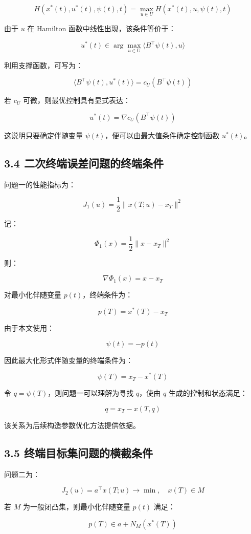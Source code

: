 \documentclass[UTF8,a4paper,zihao=-4]{ctexart}
\begin{document}
\[
H(x^*(t),u^*(t),\psi(t),t)
=
\max_{u\in U}H(x^*(t),u,\psi(t),t)
\]

由于 $u$ 在 Hamilton 函数中线性出现，该条件等价于：

\[
u^*(t)\in\arg\max_{u\in U}
\langle B^\top\psi(t),u\rangle
\]

利用支撑函数，可写为：

\[
\langle B^\top\psi(t),u^*(t)\rangle
=
c_U(B^\top\psi(t))
\]

若 $c_U$ 可微，则最优控制具有显式表达：

\[
u^*(t)=\nabla c_U(B^\top\psi(t))
\]

这说明只要确定伴随变量 $\psi(t)$，便可以由最大值条件确定控制函数 $u^*(t)$。

\subsection{3.4 二次终端误差问题的终端条件}

问题一的性能指标为：

\[
J_1(u)=\frac{1}{2}\|x(T;u)-x_T\|^2
\]

记：

\[
\Phi_1(x)=\frac{1}{2}\|x-x_T\|^2
\]

则：

\[
\nabla\Phi_1(x)=x-x_T
\]

对最小化伴随变量 $p(t)$，终端条件为：

\[
p(T)=x^*(T)-x_T
\]

由于本文使用：

\[
\psi(t)=-p(t)
\]

因此最大化形式伴随变量的终端条件为：

\[
\psi(T)=x_T-x^*(T)
\]

令 $q=\psi(T)$，则问题一可以理解为寻找 $q$，使由 $q$ 生成的控制和状态满足：

\[
q=x_T-x(T,q)
\]

该关系为后续构造参数优化方法提供依据。

\subsection{3.5 终端目标集问题的横截条件}

问题二为：

\[
J_2(u)=a^\top x(T;u)\to\min,\quad x(T)\in M
\]

若 $M$ 为一般闭凸集，则最小化伴随变量 $p(t)$ 满足\cite[第121--127页]{pontryagin1969}\cite[第336--371页]{lee1972}：

\[
p(T)\in a+N_M(x^*(T))
\]
\end{document}
